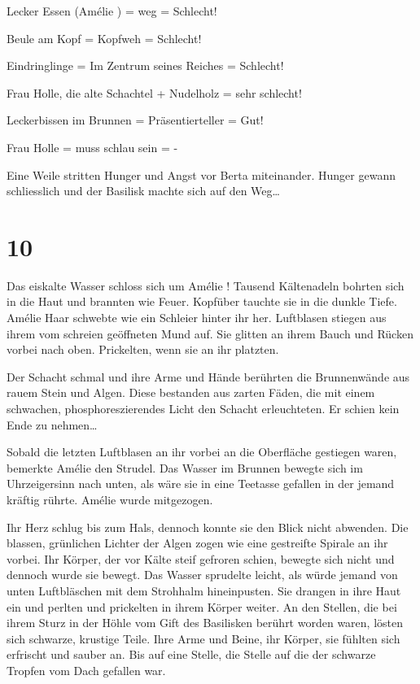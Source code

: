\documentclass[11pt,titlepage,a5paper]{book}
\newcommand{\am}{Amélie }
\begin{document}
Lecker Essen (\am ) = weg = Schlecht!

Beule am Kopf = Kopfweh = Schlecht! 

Eindringlinge = Im Zentrum seines Reiches = Schlecht! 

Frau Holle, die alte Schachtel + Nudelholz = sehr schlecht!

Leckerbissen im Brunnen = Präsentierteller = Gut! 

Frau Holle = muss schlau sein = -

Eine Weile stritten Hunger und Angst vor Berta miteinander. Hunger gewann schliesslich und der Basilisk machte sich auf den Weg\dots

\section*{10}

Das eiskalte Wasser schloss sich um \am ! Tausend Kältenadeln bohrten sich in die Haut und brannten wie Feuer. Kopfüber tauchte sie in die dunkle Tiefe. \am Haar schwebte wie ein Schleier hinter ihr her. Luftblasen stiegen aus ihrem vom schreien geöffneten Mund auf. Sie glitten an ihrem Bauch und Rücken vorbei nach oben. Prickelten, wenn sie an ihr platzten. 

Der Schacht schmal und ihre Arme und Hände berührten die Brunnenwände aus rauem Stein und Algen. Diese bestanden aus zarten Fäden, die mit einem schwachen, phosphoreszierendes  Licht den Schacht erleuchteten. Er schien kein Ende zu nehmen\dots

Sobald die letzten Luftblasen an ihr vorbei an die Oberfläche gestiegen waren, bemerkte \am den Strudel. Das Wasser im Brunnen bewegte sich im Uhrzeigersinn nach unten, als wäre sie in eine Teetasse gefallen in der jemand kräftig rührte. \am wurde mitgezogen.

Ihr Herz schlug bis zum Hals, dennoch konnte sie den Blick nicht abwenden. Die blassen, grünlichen Lichter der Algen zogen wie eine gestreifte Spirale an ihr vorbei. Ihr Körper, der vor Kälte steif gefroren schien, bewegte sich nicht und dennoch wurde sie bewegt. Das Wasser sprudelte leicht, als würde jemand von unten Luftbläschen mit dem Strohhalm hineinpusten. Sie drangen in ihre Haut ein und perlten und prickelten in ihrem Körper weiter. An den Stellen, die bei ihrem Sturz in der Höhle vom Gift des Basilisken berührt worden waren, lösten sich schwarze, krustige Teile. Ihre Arme und Beine, ihr Körper, sie fühlten sich erfrischt und sauber an. Bis auf eine Stelle, die Stelle auf die der schwarze Tropfen vom Dach gefallen war.
\end{document}
